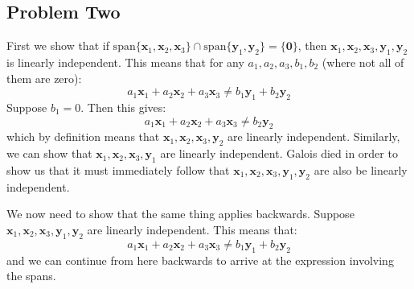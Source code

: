 \documentclass{article}
\newcommand{\spann}[1]{\mathrm{span}\{#1\}}
\begin{document}
\subsection*{Problem Two}
First we show that if $\spann{\bm{x}_1,\bm{x}_2,\bm{x}_3} \cap \spann{\bm{y}_1,\bm{y}_2} = \{\bm{0}\}$, then $\bm{x}_1,\bm{x}_2,\bm{x}_3,\bm{y}_1,\bm{y}_2$ is linearly independent. This means that for any $a_1, a_2, a_3, b_1, b_2$ (where not all of them are zero):
\begin{equation}
    a_1\bm{x}_1 + a_2\bm{x}_2 + a_3\bm{x}_3 \neq b_1\bm{y}_1 + b_2\bm{y}_2
\end{equation}
Suppose $b_1=0$. Then this gives:
\begin{equation}
    a_1\bm{x}_1 + a_2\bm{x}_2 + a_3\bm{x}_3 \neq b_2\bm{y}_2
\end{equation}
which by definition means that $\bm{x}_1,\bm{x}_2,\bm{x}_3,\bm{y}_2$ are linearly independent. Similarly, we can show that $\bm{x}_1,\bm{x}_2,\bm{x}_3,\bm{y}_1$ are linearly independent. Galois died in order to show us that it must immediately follow that $\bm{x}_1,\bm{x}_2,\bm{x}_3,\bm{y}_1, \bm{y}_2$ are also be linearly independent.
\vspace{2mm}

We now need to show that the same thing applies backwards. Suppose $\bm{x}_1,\bm{x}_2,\bm{x}_3,\bm{y}_1,\bm{y}_2$ are linearly independent. This means that:
\begin{equation}
    a_1\bm{x}_1 + a_2\bm{x}_2 + a_3\bm{x}_3 \neq b_1\bm{y}_1 + b_2\bm{y}_2
\end{equation}
and we can continue from here backwards to arrive at the expression involving the spans.
\end{document}
